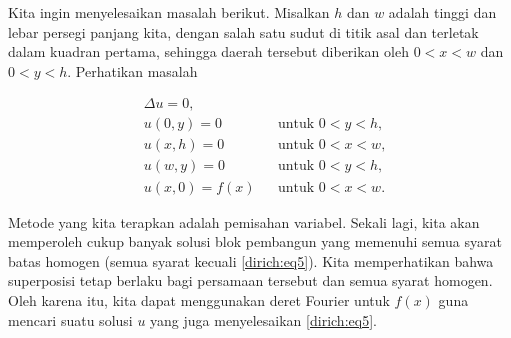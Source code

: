 Kita ingin menyelesaikan masalah berikut.  Misalkan $h$ dan $w$
adalah tinggi dan lebar persegi panjang kita, dengan salah satu sudut di titik asal dan
terletak dalam kuadran pertama, sehingga daerah tersebut
diberikan oleh $0 < x < w$ dan $0 < y < h$.
Perhatikan masalah


\begin{center}
\begin{minipage}[b]{2.8in}
\vspace{\fill}
\begin{align}
& \Delta u = 0 , & &  \label{dirich:eq1} \\
& u(0,y) = 0 & & \text{untuk }  0 < y < h,\label{dirich:eq2} \\
& u(x,h) = 0 & & \text{untuk }  0 < x < w,\label{dirich:eq3} \\
& u(w,y) = 0 & & \text{untuk }  0 < y < h,\label{dirich:eq4} \\
& u(x,0) = f(x) & & \text{untuk }  0 < x < w.\label{dirich:eq5}
\end{align}
\vspace{\fill}
\end{minipage}
\qquad
\qquad
\end{center}

Metode yang kita terapkan adalah pemisahan variabel.  Sekali lagi, kita akan
memperoleh cukup banyak solusi
blok pembangun yang memenuhi semua syarat batas homogen
(semua syarat kecuali \eqref{dirich:eq5}).  Kita memperhatikan bahwa superposisi
tetap berlaku bagi persamaan tersebut dan semua syarat homogen.
Oleh karena itu,
kita dapat menggunakan deret Fourier untuk $f(x)$ guna mencari
suatu solusi $u$ yang juga menyelesaikan \eqref{dirich:eq5}.

